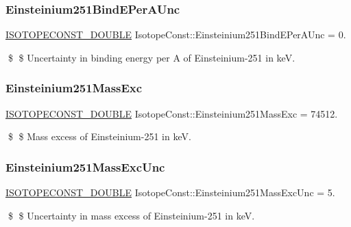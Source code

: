 \subsubsection{\texorpdfstring{Einsteinium251\+Bind\+E\+Per\+A\+Unc}{Einsteinium251BindEPerAUnc}}
{\footnotesize\ttfamily \mbox{\hyperlink{group___isotope_const-_macros_ga8f45a7272ce02c0b4c65c44636ed719a}{I\+S\+O\+T\+O\+P\+E\+C\+O\+N\+S\+T\+\_\+\+D\+O\+U\+B\+LE}} Isotope\+Const\+::\+Einsteinium251\+Bind\+E\+Per\+A\+Unc = 0.}

\$ \$ Uncertainty in binding energy per A of Einsteinium-\/251 in keV. \mbox{\label{group___isotope_const-_einsteinium-_es251_gadf603d3672c7da1c38890ebab5adc4b3}} 
\subsubsection{\texorpdfstring{Einsteinium251\+Mass\+Exc}{Einsteinium251MassExc}}
{\footnotesize\ttfamily \mbox{\hyperlink{group___isotope_const-_macros_ga8f45a7272ce02c0b4c65c44636ed719a}{I\+S\+O\+T\+O\+P\+E\+C\+O\+N\+S\+T\+\_\+\+D\+O\+U\+B\+LE}} Isotope\+Const\+::\+Einsteinium251\+Mass\+Exc = 74512.}

\$ \$ Mass excess of Einsteinium-\/251 in keV. \mbox{\label{group___isotope_const-_einsteinium-_es251_ga16e3281cfaf8285072bc05de9f63906a}} 
\subsubsection{\texorpdfstring{Einsteinium251\+Mass\+Exc\+Unc}{Einsteinium251MassExcUnc}}
{\footnotesize\ttfamily \mbox{\hyperlink{group___isotope_const-_macros_ga8f45a7272ce02c0b4c65c44636ed719a}{I\+S\+O\+T\+O\+P\+E\+C\+O\+N\+S\+T\+\_\+\+D\+O\+U\+B\+LE}} Isotope\+Const\+::\+Einsteinium251\+Mass\+Exc\+Unc = 5.}

\$ \$ Uncertainty in mass excess of Einsteinium-\/251 in keV. \mbox{\label{group___isotope_const-_einsteinium-_es251_gac4bdb60af586d51f3df2197f9c6e9782}} 
